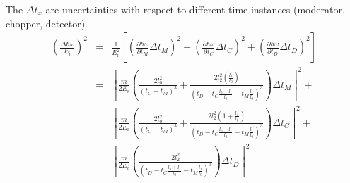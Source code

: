\documentclass[11pt,oneside,reqno]{amsart}
\begin{document}
The $\Delta t_x$ are uncertainties with respect  to different time instances (moderator, chopper, detector).
\begin{eqnarray}
\left(\frac{\Delta \hbar \omega}{E_i}\right)^2&=&\frac{1}{E_i^2}\left[\left(\frac{\partial \hbar \omega}{\partial t_M}\Delta t_M \right)^2
+\left(\frac{\partial \hbar \omega}{\partial t_C}\Delta t_C \right)^2
+\left(\frac{\partial \hbar \omega}{\partial t_D}\Delta t_D \right)^2\right]\\
&=&\left[\frac{m}{2E_i}\left(\frac{2 l_0^2}{(t_C-t_M)^3} + \frac{2 l_2^2 \left(\frac{l_1}{l_0}\right)}{\left(t_D-t_C\frac{l_0+l_1}{l_0}-t_M\frac{l_1}{l_0}\right)^3}\right)\Delta t_M\right]^2+\nonumber\\
&&\left[\frac{m}{2E_i}\left(\frac{2 l_0^2}{(t_C-t_M)^3} + \frac{2 l_2^2 \left(1+\frac{l_1}{l_0}\right)}{\left(t_D-t_C\frac{l_0+l_1}{l_0}-t_M\frac{l_1}{l_0}\right)^3}\right)\Delta t_C\right]^2+\nonumber\\
&&\left[\frac{m}{2E_i}\left(\frac{2 l_2^2}{\left(t_D-t_C\frac{l_0+l_1}{l_0}-t_M\frac{l_1}{l_0}\right)^3}\right)\Delta t_D\right]^2
\end{eqnarray}
\end{document}
